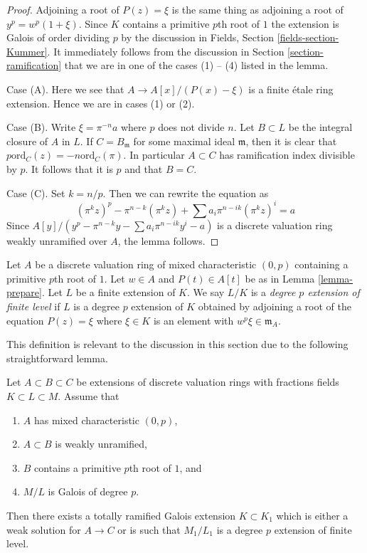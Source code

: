 \begin{proof}
Adjoining a root of $P(z) = \xi$ is the same thing as adjoining a root
of $y^p = w^p(1 + \xi)$. Since $K$ contains a primitive $p$th root of $1$
the extension is Galois of order dividing $p$ by the discussion in
Fields, Section \ref{fields-section-Kummer}.
It immediately follows from the discussion in
Section \ref{section-ramification} that we are in one of the cases (1) -- (4)
listed in the lemma.

\medskip\noindent
Case (A). Here we see that $A \to A[x]/(P(x) - \xi)$ is a finite
\'etale ring extension. Hence we are in cases (1) or (2).

\medskip\noindent
Case (B). Write $\xi = \pi^{-n}a$ where $p$ does not divide $n$.
Let $B \subset L$ be the integral closure of $A$ in $L$.
If $C = B_\mathfrak m$ for some maximal ideal $\mathfrak m$,
then it is clear that $p \text{ord}_C(z) = -n \text{ord}_C(\pi)$.
In particular $A \subset C$ has ramification index divisible by $p$.
It follows that it is $p$ and that $B = C$.

\medskip\noindent
Case (C). Set $k = n/p$. Then we can rewrite the equation as
$$
(\pi^kz)^p - \pi^{n - k} (\pi^kz) + \sum a_i \pi^{n - ik} (\pi^kz)^i = a
$$
Since $A[y]/(y^p - \pi^{n - k}y - \sum  a_i \pi^{n - ik} y^i - a)$
is a discrete valuation ring weakly unramified over $A$, the lemma follows.
\end{proof}

\noindent
Let $A$ be a discrete valuation ring of mixed characteristic $(0, p)$
containing a primitive $p$th root of $1$. Let $w \in A$ and $P(t) \in A[t]$
be as in Lemma \ref{lemma-prepare}. Let $L$ be a finite extension of $K$.
We say $L/K$ is a {\it degree $p$ extension of finite level}
if $L$ is a degree $p$ extension of $K$ obtained by adjoining a
root of the equation $P(z) = \xi$ where $\xi \in K$ is an
element with $w^p \xi \in \mathfrak m_A$.

\medskip\noindent
This definition is relevant to the discussion in this section due
to the following straightforward lemma.

\begin{lemma}
\label{lemma-make-finite-level}
Let $A \subset B \subset C$ be extensions of discrete valuation rings
with fractions fields $K \subset L \subset M$. Assume that
\begin{enumerate}
\item $A$ has mixed characteristic $(0, p)$,
\item $A \subset B$ is weakly unramified,
\item $B$ contains a primitive $p$th root of $1$, and
\item $M/L$ is Galois of degree $p$.
\end{enumerate}
Then there exists a totally ramified Galois extension $K \subset K_1$
which is either a weak solution for $A \to C$ or is such that
$M_1/L_1$ is a degree $p$ extension of finite level.
\end{lemma}

